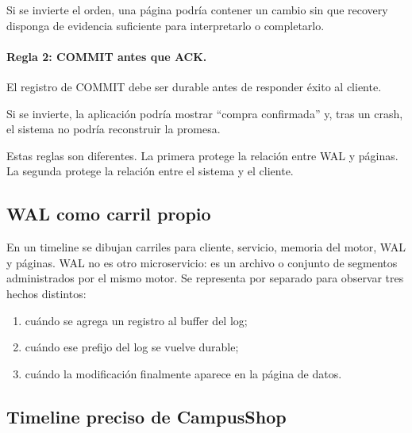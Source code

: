 \documentclass[variant=apuntes,cover=institutional,mode=screen]{ua-engineering-v6-article}
\begin{document}
Si se invierte el orden, una página podría contener un cambio sin que recovery disponga de evidencia suficiente para interpretarlo o completarlo.

\paragraph{Regla 2: COMMIT antes que ACK.} El registro de COMMIT debe ser durable antes de responder éxito al cliente.

Si se invierte, la aplicación podría mostrar ``compra confirmada'' y, tras un crash, el sistema no podría reconstruir la promesa.

Estas reglas son diferentes. La primera protege la relación entre WAL y páginas. La segunda protege la relación entre el sistema y el cliente.

\subsection{WAL como carril propio}

En un timeline se dibujan carriles para cliente, servicio, memoria del motor, WAL y páginas. WAL no es otro microservicio: es un archivo o conjunto de segmentos administrados por el mismo motor. Se representa por separado para observar tres hechos distintos:

\begin{enumerate}
\item cuándo se agrega un registro al buffer del log;
\item cuándo ese prefijo del log se vuelve durable;
\item cuándo la modificación finalmente aparece en la página de datos.
\end{enumerate}

\subsection{Timeline preciso de CampusShop}
\end{document}
